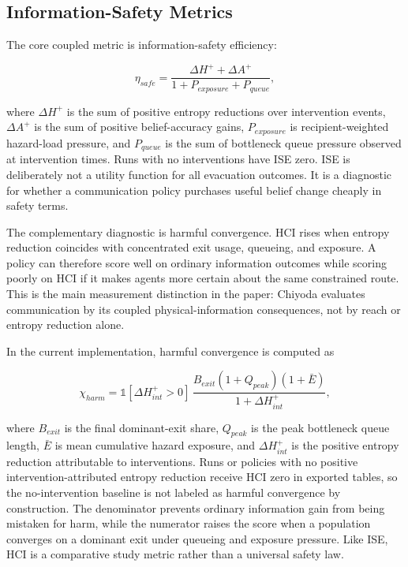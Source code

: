 \subsection{Information-Safety Metrics}
\label{subsec:metrics}

The core coupled metric is information-safety efficiency:

\[
\eta_{safe} =
\frac{\Delta H^{+} + \Delta A^{+}}
     {1 + P_{exposure} + P_{queue}},
\]

where $\Delta H^{+}$ is the sum of positive entropy reductions over
intervention events, $\Delta A^{+}$ is the sum of positive belief-accuracy
gains, $P_{exposure}$ is recipient-weighted hazard-load pressure, and
$P_{queue}$ is the sum of bottleneck queue pressure observed at intervention
times. Runs with no interventions have ISE zero. ISE is deliberately not a
utility function for all evacuation outcomes. It is a diagnostic for whether a
communication policy purchases useful belief change cheaply in safety terms.

The complementary diagnostic is harmful convergence. HCI rises when entropy
reduction coincides with concentrated exit usage, queueing, and exposure. A
policy can therefore score well on ordinary information outcomes while scoring
poorly on HCI if it makes agents more certain about the same constrained route.
This is the main measurement distinction in the paper: Chiyoda evaluates
communication by its coupled physical-information consequences, not by reach or
entropy reduction alone.

In the current implementation, harmful convergence is computed as

\[
\chi_{harm} =
\mathbb{1}[\Delta H_{int}^{+} > 0]\,
\frac{B_{exit}(1 + Q_{peak})(1 + \bar{E})}
     {1 + \Delta H_{int}^{+}},
\]

where $B_{exit}$ is the final dominant-exit share, $Q_{peak}$ is the peak
bottleneck queue length, $\bar{E}$ is mean cumulative hazard exposure, and
$\Delta H_{int}^{+}$ is the positive entropy reduction attributable to
interventions. Runs or policies with no positive intervention-attributed
entropy reduction receive HCI zero in exported tables, so the no-intervention
baseline is not labeled as harmful convergence by construction. The denominator
prevents ordinary information gain from being mistaken for harm, while the
numerator raises the score when a population converges on a dominant exit under
queueing and exposure pressure. Like ISE, HCI is a comparative study metric
rather than a universal safety law.
